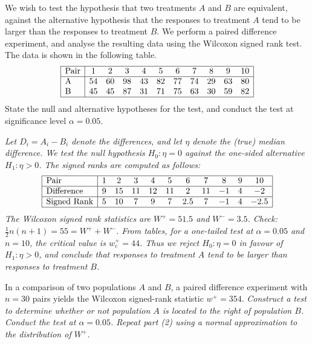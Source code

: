 \begin{exercise}
\begin{questions}

\question
We wish to test the hypothesis that two treatments $A$ and $B$ are equivalent, against the alternative hypothesis that the responses to treatment $A$ tend to be larger than the responses to treatment $B$. We perform a paired difference experiment, and analyse the resulting data using the Wilcoxon signed rank test. The data is shown in the following table.
\[\begin{array}{|l|cccccccccc|}\hline
\text{Pair}	&  1 &  2 &  3 &  4 &  5 &  6 &  7 &  8 &  9 & 10 \\ \hline
$A$ 			& 54 & 60 & 98 & 43 & 82 & 77 & 74 & 29 & 63 & 80 \\
$B$ 			& 45 & 45 & 87 & 31 & 71 & 75 & 63 & 30 & 59 & 82 \\ \hline
\end{array}\]
State the null and alternative hypotheses for the test, and conduct the test at significance level $\alpha=0.05$.

\begin{answer}
\ben
\it %
Let $D_i=A_i-B_i$ denote the differences, and let $\eta$ denote the (true) median difference. We test the null hypothesis $H_0:\eta=0$ against the one-sided alternative $H_1:\eta>0$.
\it %
The signed ranks are computed as follows:
\[\begin{array}{|l|cccccccccc|}\hline
\text{Pair}			&  1 &  2 &  3 &  4 &  5 &  6 &  7 &  8 &  9 & 10 \\ \hline
\text{Difference}	&  9 & 15 & 11 & 12 & 11 &  2 & 11 & -1 &  4 & -2 \\ \hline
\text{Signed Rank}	&  5 & 10 &  7 &  9 &  7 &2.5 &  7 & -1 &  4 & -2.5 \\ \hline
\end{array}\]
\bit
\it The Wilcoxon signed rank statistics are $W^{+} = 51.5$ and $W^{-}=3.5$. 
\it Check: $\frac{1}{2}n(n+1) = 55 = W^{+}+W^{-}$.
\it From tables, for a one-tailed test at $\alpha=0.05$ and $n=10$, the critical value is $w^{+}_c = 44$.
\it Thus we reject $H_0:\eta=0$ in favour of $H_1:\eta>0$, and conclude that responses to treatment $A$ tend to be larger than responses to treatment $B$.
\eit
\een
\end{answer}

\question
In a comparison of two populations $A$ and $B$, a paired difference experiment with $n=30$ pairs yields the Wilcoxon signed-rank statistic $w^{+}=354$.
\ben
\it Construct a test to determine whether or not population $A$ is located to the right of population $B$.
\it Conduct the test at $\alpha=0.05$.
\it Repeat part (2) using a normal approximation to the distribution of $W^{+}$.
\een


\end{questions}
\end{exercise}

